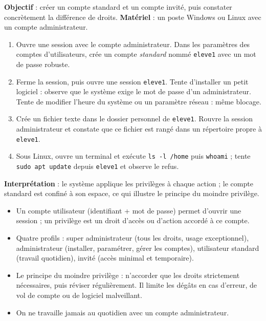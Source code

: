 \documentclass[11pt]{article}
\newcommand{\cle}[1]{{\popxbold\color{popdark}#1}}
\begin{document}
\begin{experience}
\textbf{Objectif} : créer un compte standard et un compte invité, puis constater concrètement la différence de droits. \textbf{Matériel} : un poste Windows ou Linux avec un compte administrateur.
\begin{enumerate}
  \item Ouvre une session avec le compte administrateur. Dans les paramètres des comptes d'utilisateurs, crée un compte \emph{standard} nommé \texttt{eleve1} avec un mot de passe robuste.
  \item Ferme la session, puis ouvre une session \texttt{eleve1}. Tente d'installer un petit logiciel : observe que le système exige le mot de passe d'un administrateur. Tente de modifier l'heure du système ou un paramètre réseau : même blocage.
  \item Crée un fichier texte dans le dossier personnel de \texttt{eleve1}. Rouvre la session administrateur et constate que ce fichier est rangé dans un répertoire propre à \texttt{eleve1}.
  \item Sous Linux, ouvre un terminal et exécute \texttt{ls -l /home} puis \texttt{whoami} ; tente \texttt{sudo apt update} depuis \texttt{eleve1} et observe le refus.
\end{enumerate}
\textbf{Interprétation} : le système applique les privilèges à chaque action ; le compte standard est confiné à son espace, ce qui illustre le principe du moindre privilège.
\end{experience}

\begin{aretenir}
\begin{itemize}
  \item Un \cle{compte utilisateur} (identifiant + mot de passe) permet d'ouvrir une session ; un \cle{privilège} est un droit d'accès ou d'action accordé à ce compte.
  \item Quatre profils : \cle{super administrateur} (tous les droits, usage exceptionnel), \cle{administrateur} (installer, paramétrer, gérer les comptes), \cle{utilisateur standard} (travail quotidien), \cle{invité} (accès minimal et temporaire).
  \item Le \cle{principe du moindre privilège} : n'accorder que les droits strictement nécessaires, puis réviser régulièrement. Il limite les dégâts en cas d'erreur, de vol de compte ou de logiciel malveillant.
  \item On ne travaille jamais au quotidien avec un compte administrateur.
\end{itemize}
\end{aretenir}
\end{document}
